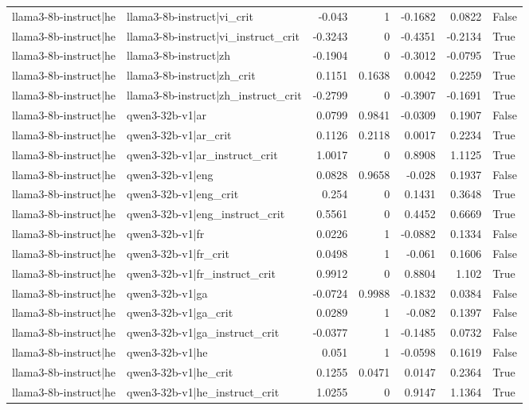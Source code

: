 \begin{table}
\begin{tabular}{l l r r r r l}
llama3-8b-instruct|he & llama3-8b-instruct|vi_crit & -0.043 & 1 & -0.1682 & 0.0822 & False \\
llama3-8b-instruct|he & llama3-8b-instruct|vi_instruct_crit & -0.3243 & 0 & -0.4351 & -0.2134 & True \\
llama3-8b-instruct|he & llama3-8b-instruct|zh & -0.1904 & 0 & -0.3012 & -0.0795 & True \\
llama3-8b-instruct|he & llama3-8b-instruct|zh_crit & 0.1151 & 0.1638 & 0.0042 & 0.2259 & True \\
llama3-8b-instruct|he & llama3-8b-instruct|zh_instruct_crit & -0.2799 & 0 & -0.3907 & -0.1691 & True \\
llama3-8b-instruct|he & qwen3-32b-v1|ar & 0.0799 & 0.9841 & -0.0309 & 0.1907 & False \\
llama3-8b-instruct|he & qwen3-32b-v1|ar_crit & 0.1126 & 0.2118 & 0.0017 & 0.2234 & True \\
llama3-8b-instruct|he & qwen3-32b-v1|ar_instruct_crit & 1.0017 & 0 & 0.8908 & 1.1125 & True \\
llama3-8b-instruct|he & qwen3-32b-v1|eng & 0.0828 & 0.9658 & -0.028 & 0.1937 & False \\
llama3-8b-instruct|he & qwen3-32b-v1|eng_crit & 0.254 & 0 & 0.1431 & 0.3648 & True \\
llama3-8b-instruct|he & qwen3-32b-v1|eng_instruct_crit & 0.5561 & 0 & 0.4452 & 0.6669 & True \\
llama3-8b-instruct|he & qwen3-32b-v1|fr & 0.0226 & 1 & -0.0882 & 0.1334 & False \\
llama3-8b-instruct|he & qwen3-32b-v1|fr_crit & 0.0498 & 1 & -0.061 & 0.1606 & False \\
llama3-8b-instruct|he & qwen3-32b-v1|fr_instruct_crit & 0.9912 & 0 & 0.8804 & 1.102 & True \\
llama3-8b-instruct|he & qwen3-32b-v1|ga & -0.0724 & 0.9988 & -0.1832 & 0.0384 & False \\
llama3-8b-instruct|he & qwen3-32b-v1|ga_crit & 0.0289 & 1 & -0.082 & 0.1397 & False \\
llama3-8b-instruct|he & qwen3-32b-v1|ga_instruct_crit & -0.0377 & 1 & -0.1485 & 0.0732 & False \\
llama3-8b-instruct|he & qwen3-32b-v1|he & 0.051 & 1 & -0.0598 & 0.1619 & False \\
llama3-8b-instruct|he & qwen3-32b-v1|he_crit & 0.1255 & 0.0471 & 0.0147 & 0.2364 & True \\
llama3-8b-instruct|he & qwen3-32b-v1|he_instruct_crit & 1.0255 & 0 & 0.9147 & 1.1364 & True \\

\end{tabular}
\end{table}
